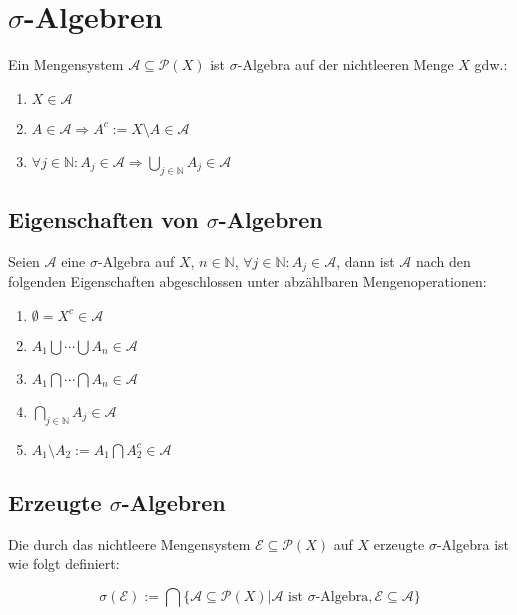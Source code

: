 \section*{$\sigma$-Algebren}

Ein Mengensystem $\mathcal{A} \subseteq \mathcal{P}(X)$ ist $\sigma$-Algebra auf der nichtleeren Menge $X$ gdw.:

\begin{enumerate}[label=(\alph*)]
	\item $X \in \mathcal{A}$
	\item $A \in \mathcal{A} \Rightarrow A^c := X\setminus A \in \mathcal{A}$
	\item $\forall j \in \mathbb{N} : A_j \in \mathcal{A} \Rightarrow \bigcup_{j\in \mathbb{N}} A_j \in \mathcal{A}$
\end{enumerate}

\subsection*{Eigenschaften von $\sigma$-Algebren}

Seien $\mathcal{A}$ eine $\sigma$-Algebra auf $X$, $n \in \mathbb{N}$, $\forall j \in \mathbb{N} : A_j \in \mathcal{A}$, dann ist $\mathcal{A}$ nach den folgenden Eigenschaften abgeschlossen unter abzählbaren Mengenoperationen:

\begin{enumerate}[label=(\alph*)]
	\item $\emptyset = X^c \in \mathcal{A}$
	\item $A_1 \bigcup \cdots \bigcup A_n \in \mathcal{A}$
	\item $A_1 \bigcap \cdots \bigcap A_n \in \mathcal{A}$
	\item $\bigcap_{j\in \mathbb{N}} A_j \in \mathcal{A}$
	\item $A_1 \setminus A_2 := A_1 \bigcap A_2^c \in \mathcal{A}$
\end{enumerate}

\subsection*{Erzeugte $\sigma$-Algebren}

Die durch das nichtleere Mengensystem $\mathcal{E} \subseteq \mathcal{P}(X)$ auf $X$ erzeugte $\sigma$-Algebra ist wie folgt definiert:

\vspace*{-4mm}
$$\sigma(\mathcal{E}) := \bigcap\{ \mathcal{A} \subseteq \mathcal{P}(X) | \mathcal{A} \text{ ist } \sigma \text{-Algebra}, \mathcal{E} \subseteq \mathcal{A} \}$$

